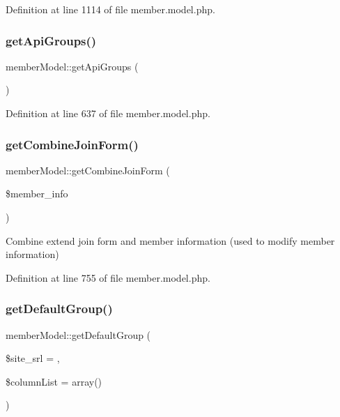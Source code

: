 Definition at line 1114 of file member.\+model.\+php.

\mbox{\label{classmemberModel_a7b52f35158a9d2dc8138359fcf120b88}} 
\subsubsection{\texorpdfstring{get\+Api\+Groups()}{getApiGroups()}}
{\footnotesize\ttfamily member\+Model\+::get\+Api\+Groups (\begin{DoxyParamCaption}{ }\end{DoxyParamCaption})}



Definition at line 637 of file member.\+model.\+php.

\mbox{\label{classmemberModel_a0bb14a9030332a0ab996bf545ff77de6}} 
\subsubsection{\texorpdfstring{get\+Combine\+Join\+Form()}{getCombineJoinForm()}}
{\footnotesize\ttfamily member\+Model\+::get\+Combine\+Join\+Form (\begin{DoxyParamCaption}\item[{}]{\$member\+\_\+info }\end{DoxyParamCaption})}



Combine extend join form and member information (used to modify member information) 



Definition at line 755 of file member.\+model.\+php.

\mbox{\label{classmemberModel_ab3b592e1198567e74b72d1ebd9d738bc}} 
\subsubsection{\texorpdfstring{get\+Default\+Group()}{getDefaultGroup()}}
{\footnotesize\ttfamily member\+Model\+::get\+Default\+Group (\begin{DoxyParamCaption}\item[{}]{\$site\+\_\+srl = {},  }\item[{}]{\$column\+List = {\ttfamily array()} }\end{DoxyParamCaption})}



